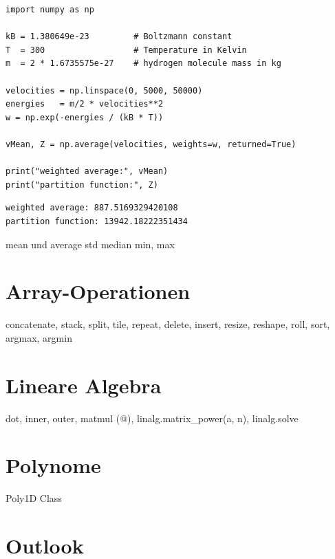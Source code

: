 \begin{codebox}
\begin{verbatim}
import numpy as np

kB = 1.380649e-23         # Boltzmann constant
T  = 300                  # Temperature in Kelvin
m  = 2 * 1.6735575e-27    # hydrogen molecule mass in kg

velocities = np.linspace(0, 5000, 50000)
energies   = m/2 * velocities**2
w = np.exp(-energies / (kB * T))

vMean, Z = np.average(velocities, weights=w, returned=True)

print("weighted average:", vMean)
print("partition function:", Z)
\end{verbatim}
\end{codebox}
%
\begin{cmdbox}
\begin{verbatim}
weighted average: 887.5169329420108
partition function: 13942.18222351434
\end{verbatim}
\end{cmdbox}

mean und average
std
median
min, max


\section{Array-Operationen}
concatenate, stack, split, tile, repeat, delete, insert, resize, reshape, roll, sort, argmax, argmin

\section{Lineare Algebra}
dot, inner, outer, matmul (@), linalg.matrix\_power(a, n), linalg.solve

\section{Polynome}
Poly1D Class

\section{Outlook}
